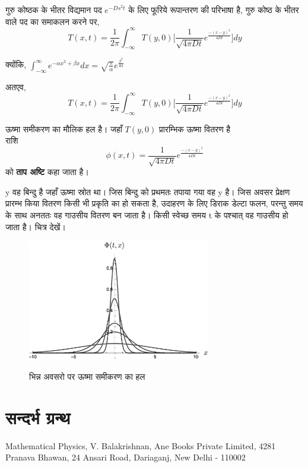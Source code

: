 \documentclass[10pt,a4paper,twoside]{article}
\begin{document}
गुरु कोष्ठक के भीतर विद्यमान पद $e^{-Ds^2t}$ के लिए फूरिये रूपान्तरण की परिभाषा है,
गुरु कोष्ठ के भीतर वाले पद का समाकलन करने पर, 
\begin{equation}
    T(x,t) = \frac{1}{{2\pi}}\int_{-\infty}^{\infty} T(y,0) \bigg[\frac{1}{\sqrt{4\pi Dt}} e^ {\frac{-(x-y)^2}{4Dt}} \bigg] dy 
\end{equation} 

क्योंकि, $\int_{-\infty}^{\infty} e^{-\alpha x^2 + \beta x} dx = \sqrt{\frac{\pi}{\alpha}} e^{\frac{\beta ^2}{4 \alpha}}$

अतएव, 
\begin{equation}
    T(x,t) = \frac{1}{{2\pi}}\int_{-\infty}^{\infty} T(y,0) \bigg[\frac{1}{\sqrt{4\pi Dt}} e^ {\frac{-(x-y)^2}{4Dt}} \bigg] dy 
\end{equation} 

ऊष्मा समीकरण का मौलिक हल है। 
जहाँ $T(y,0)$ प्रारम्भिक ऊष्मा वितरण है\\
राशि 
\begin{equation}
    \phi (x,t) = \frac{1}{\sqrt{4\pi Dt}} e^ {\frac{-(x-y)^2}{4Dt}}
\end{equation} 
को \textbf{ताप अष्टि} कहा जाता है।

 
 
 y वह बिन्दु है जहाँ ऊष्मा स्रोत था। जिस बिन्दु को प्रथमतः तपाया गया वह y है। जिस अवसर प्रेक्षण प्रारम्भ किया वितरण किसी भी प्रकृति का हो सकता है, उदाहरण के लिए डिराक डेल्टा फलन, परन्तु समय के साथ अनततः वह गाउसीय वितरण बन जाता है। किसी स्वेच्छ समय t के पश्चात् वह गाउसीय हो जाता है। चित्र देखें।
\begin{figure}[h] %
\centering
\includegraphics[width=8cm]{Fundamental-solution-to-the-heat-equation-at-different-time-moments-Note-that-if-t-0.png}
\label{Fundamental-solution-to-the-heat-equation-at-different-time-moments-Note-that-if-t-0}
\caption{भिन्न अवसरो पर ऊष्मा समीकरण का हल}
\end{figure}





\newpage
\section{सन्दर्भ ग्रन्थ}

Mathematical Physics, V. Balakrishnan, Ane Books Private Limited, 4281 Pranava Bhawan, 24 Ansari Road, Dariaganj, New Delhi - 110002
\end{document}
